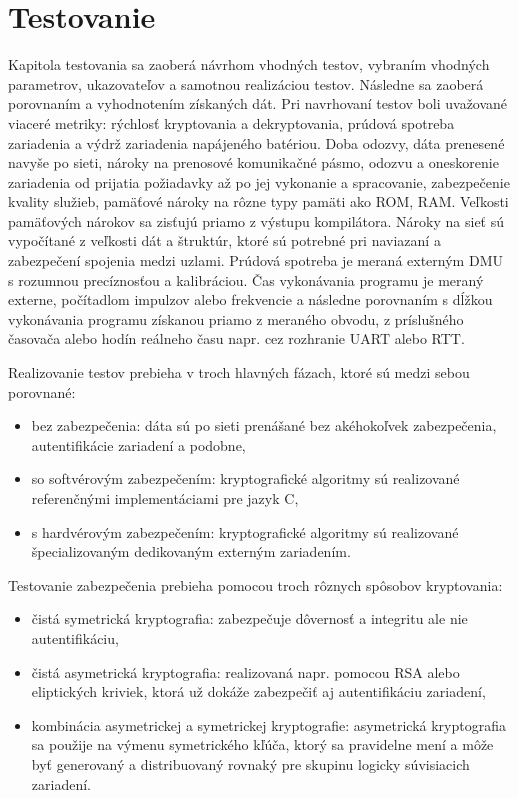 \documentclass[12pt,a4wide,oneside,openright]{report}
\begin{document}
\chapter{Testovanie} \label{s_testing}
Kapitola testovania sa zaoberá návrhom vhodných testov, vybraním vhodných parametrov, ukazovateľov a samotnou realizáciou testov. Následne sa zaoberá porovnaním a vyhodnotením získaných dát.
Pri navrhovaní testov boli uvažované viaceré metriky: rýchlosť kryptovania a dekryptovania, prúdová spotreba zariadenia a výdrž zariadenia napájeného batériou. Doba odozvy, dáta prenesené navyše po sieti, nároky na prenosové komunikačné pásmo, odozvu a oneskorenie zariadenia od prijatia požiadavky až po jej vykonanie a spracovanie, zabezpečenie kvality služieb, pamäťové nároky na rôzne typy pamäti ako ROM, RAM.
Veľkosti pamäťových nárokov sa zisťujú priamo z výstupu kompilátora. Nároky na sieť sú vypočítané z veľkosti dát a štruktúr, ktoré sú potrebné pri naviazaní a zabezpečení spojenia medzi uzlami.
Prúdová spotreba je meraná externým DMU s rozumnou precíznosťou a kalibráciou.
Čas vykonávania programu je meraný externe, počítadlom impulzov alebo frekvencie a následne porovnaním s dĺžkou vykonávania programu získanou priamo z meraného obvodu, z príslušného časovača alebo hodín reálneho času napr. cez rozhranie UART alebo RTT.

Realizovanie testov prebieha v troch hlavných fázach, ktoré sú medzi sebou porovnané:
\begin{itemize}
	\item bez zabezpečenia: dáta sú po sieti prenášané bez akéhokoľvek zabezpečenia, autentifikácie zariadení a podobne,
	\item so softvérovým zabezpečením: kryptografické algoritmy sú realizované referenčnými implementáciami pre jazyk C,
	\item s hardvérovým zabezpečením: kryptografické algoritmy sú realizované špecializovaným dedikovaným externým zariadením.
\end{itemize}
\onehalfspacing

Testovanie zabezpečenia prebieha pomocou troch rôznych spôsobov kryptovania:
\begin{itemize}
	\item čistá symetrická kryptografia: zabezpečuje dôvernosť a integritu ale nie autentifikáciu,
	\item čistá asymetrická kryptografia: realizovaná napr. pomocou RSA alebo eliptických kriviek, ktorá už dokáže zabezpečiť aj autentifikáciu zariadení,
	\item kombinácia asymetrickej a symetrickej kryptografie: asymetrická kryptografia sa použije na výmenu symetrického kľúča, ktorý sa pravidelne mení a môže byť generovaný a distribuovaný rovnaký pre skupinu logicky súvisiacich zariadení.
\end{itemize}
\onehalfspacing
\end{document}
